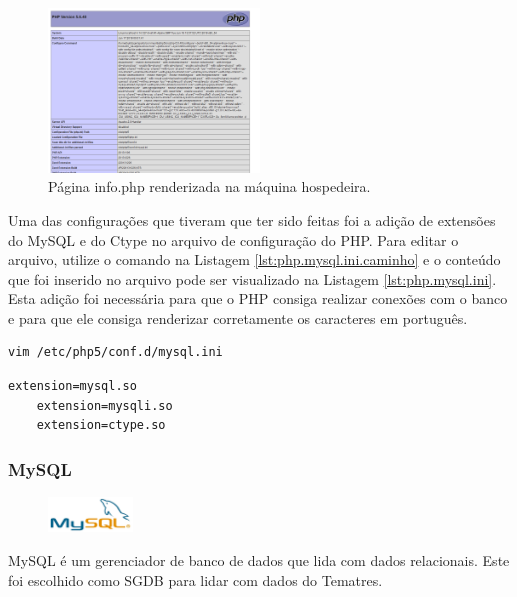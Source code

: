 \begin{figure}[H]
    \centering
    \includegraphics[width=0.5\textwidth]{../images/php2.png}
    \caption{Página info.php renderizada na máquina hospedeira.}
    \label{fig:info.php}
\end{figure}

Uma das configurações que tiveram que ter sido feitas foi a adição de extensões do MySQL e do Ctype no arquivo de configuração do PHP. Para editar o arquivo, utilize o comando na Listagem \ref{lst:php.mysql.ini.caminho} e o conteúdo que foi inserido no arquivo pode ser visualizado na Listagem \ref{lst:php.mysql.ini}. Esta adição foi necessária para que o PHP consiga realizar conexões com o banco e para que ele consiga renderizar corretamente os caracteres em português.

\begin{lstlisting}[language=bash, label=lst:php.mysql.ini.caminho, caption=Abrir no vim o arquivo mysql.ini.]
    vim /etc/php5/conf.d/mysql.ini
\end{lstlisting}

\begin{lstlisting}[label=lst:php.mysql.ini, caption=Conteúdo do arquivo mysql.ini.]
    extension=mysql.so
    extension=mysqli.so
    extension=ctype.so
\end{lstlisting}

\subsubsection{MySQL}\label{mysql}
\begin{figure} %
    \centering
    \includegraphics[width=0.2\textwidth]{../images/mysql.png}
\end{figure}
MySQL é um gerenciador de banco de dados que lida com dados relacionais. Este foi escolhido como SGDB para lidar com dados do Tematres.

